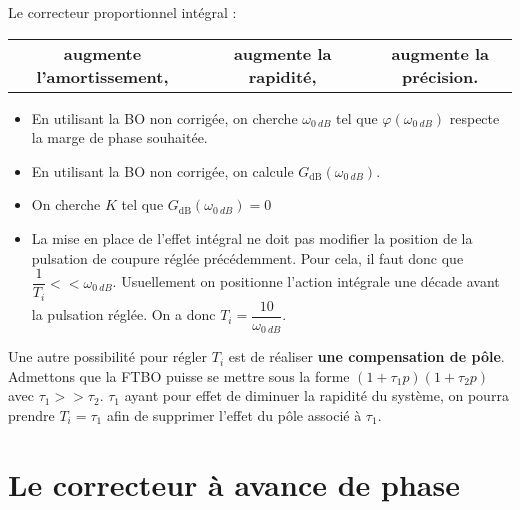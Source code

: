 \begin{resultat}
Le correcteur proportionnel intégral : 
\begin{center}
\begin{tabular}{ccccc}
\textbf{augmente l'amortissement,} &&
\textbf{augmente la rapidité,} && 
\textbf{augmente la précision.} \\
\end{tabular}
\end{center}
\end{resultat}



\begin{methode}
\begin{itemize}
\item En utilisant la BO non corrigée, on cherche $\omega_{\SI{0}{dB}}$ tel que $\varphi(\omega_{\SI{0}{dB}})$ respecte la marge de phase souhaitée. 
\item En utilisant la BO non corrigée, on calcule $G_{\text{dB}}\left(\omega_{\SI{0}{dB}}\right)$. 
\item On cherche $K$ tel que $G_{\text{dB}}\left(\omega_{\SI{0}{dB}}\right)=0$
\item La mise en place de l'effet intégral ne doit pas modifier la position de la pulsation de coupure réglée précédemment. Pour cela, il faut donc que $\dfrac{1}{T_i}<< \omega_{\SI{0}{dB}}$. Usuellement on positionne l'action intégrale une décade avant la pulsation réglée. On a donc $T_i=\dfrac{10}{\omega_{\SI{0}{dB}}}$.
\end{itemize}
\end{methode}
\vspace{-.8cm}
\begin{rem}
Une autre possibilité pour régler $T_i$ est de réaliser \textbf{une compensation de pôle}. Admettons que la FTBO puisse se mettre sous la forme $(1+\tau_1 p)(1+\tau_2 p)$ avec $\tau_1>>\tau_2$. $\tau_1$ ayant pour effet de diminuer la rapidité du système, on pourra prendre $T_i=\tau_1$ afin de supprimer l'effet du pôle associé à $\tau_1$.
\end{rem}
\newpage

\section{Le correcteur à avance de phase}



